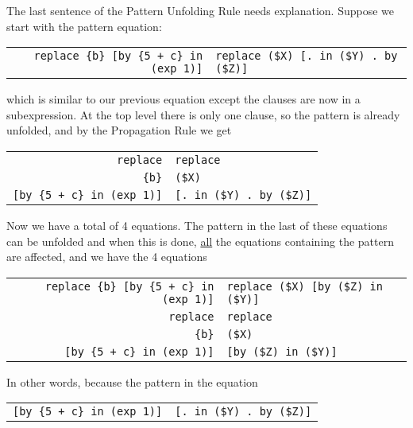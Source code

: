 \documentclass[12pt]{article}
\newcommand{\TILDE}{\usebox{\TILDEBOX}}
\begin{document}
The last sentence of the Pattern Unfolding Rule needs explanation.
Suppose we start with the pattern equation:

\begin{center}
\begin{tabular}{r@{\tt ~:=\TILDE~}l}
\verb/replace {b} [by {5 + c} in (exp 1)]/
	& \verb/replace ($X) [. in ($Y) . by ($Z)]/ \\
\end{tabular}
\end{center}

which is similar to our previous equation except the clauses are
now in a subexpression.  At the top level there is only one clause,
so the pattern is already unfolded, and by the Propagation Rule
we get

\begin{center}
\begin{tabular}{r@{\tt ~:=\TILDE~}l}
\verb/replace/ & \verb/replace/ \\
\verb/{b}/ & \verb/($X)/ \\
\verb/[by {5 + c} in (exp 1)]/ & \verb/[. in ($Y) . by ($Z)]/ \\
\end{tabular}
\end{center}

Now we have a total of 4 equations.
The pattern in the last of these equations can be unfolded and
when this is done, \underline{all} the equations containing the pattern are
affected, and we have the 4 equations

\begin{center}
\begin{tabular}{r@{\tt ~:=\TILDE~}l}
\verb/replace {b} [by {5 + c} in (exp 1)]/
	& \verb/replace ($X) [by ($Z) in ($Y)]/ \\
\verb/replace/ & \verb/replace/ \\
\verb/{b}/ & \verb/($X)/ \\
\verb/[by {5 + c} in (exp 1)]/ & \verb/[by ($Z) in ($Y)]/ \\
\end{tabular}
\end{center}

In other words, because the pattern in the equation

\begin{center}
\begin{tabular}{r@{\tt ~:=\TILDE~}l}
\verb/[by {5 + c} in (exp 1)]/ & \verb/[. in ($Y) . by ($Z)]/ \\
\end{tabular}
\end{center}
\end{document}
